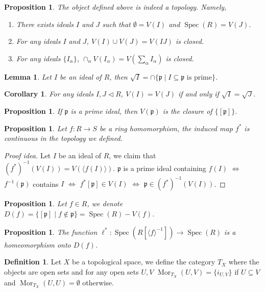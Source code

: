 \documentclass[paper=a4, fontsize=12pt]{scrartcl} %
\newtheorem{cor}[thm]{Corollary}
\newtheorem{prop}[thm]{Proposition}
\newtheorem{lem}[thm]{Lemma}
\theoremstyle{definition}
\newtheorem{defn}[thm]{Definition}
\theoremstyle{remark}
\newcommand{\lp}{{\mathfrak{p}}}
\DeclareMathOperator{\Mor}{Mor}
\DeclareMathOperator{\spec}{Spec}
\begin{document}
\begin{prop}
	The object defined above is indeed a topology. Namely,
	\begin{enumerate}
		\item There exists ideals $I$ and $J$ such that $\emptyset = V(I)$ and $\spec(R) = V(J)$.
		\item For any ideals $I$ and $J$, $V(I) \cup V(J) = V(IJ)$ is closed.
		\item For any ideals $\{I_{\alpha}\}$, $\cap_{\alpha} V(I_{\alpha}) = V(\sum_{\alpha} I_{\alpha})$ is closed.
	\end{enumerate}
\end{prop}
\begin{lem}
	Let $I$ be an ideal of $R$, then $\sqrt{I} = \cap \{\lp \mid I \subseteq \lp \text{ is prime}\}$.
\end{lem}
\begin{cor}
	For any ideals $I, J \lhd R$, $V(I) = V(J)$ if and only if $\sqrt{I} = \sqrt{J}$.
\end{cor}
\begin{prop}
	If $\lp$ is a prime ideal, then $V(\lp)$ is the closure of $\{[\lp]\}$.
\end{prop}
\begin{prop}
	Let $f:R\rightarrow S$ be a ring homomorphism, the induced map $f^*$ is continuous in the topology we defined.
\end{prop}
\begin{proof}[Proof idea]
	Let $I$ be an ideal of $R$, we claim that $(f^{*})^{-1}(V(I)) = V(\langle f(I) \rangle)$. $\lp$ is a prime ideal containing $f(I)$ $\Leftrightarrow$ $f^{-1}(\lp)$ contains $I$ $\Leftrightarrow$ $f^*[\lp] \in V(I)$ $\Leftrightarrow$ $\lp \in (f^{*})^{-1}(V(I))$.
\end{proof}
\begin{prop}
	Let $f \in R$, we denote $D(f) = \{[\lp] \mid f \notin \lp\} = \spec(R) - V(f)$.
\end{prop}
\begin{prop}
	The function $\ell^*: \spec(R[\langle f\rangle^{-1}]) \rightarrow \spec(R)$ is a homeomorphism onto $D(f)$.
\end{prop}
\begin{defn}
	Let $X$ be a topological space, we define the category $T_X$ where the objects are open sets and for any open sets $U, V$ $\Mor_{T_X}(U,V) = \{i_{U,V}\}$ if $U\subseteq V$ and $\Mor_{T_X}(U,U) = \emptyset$ otherwise.
\end{defn}
\end{document}
